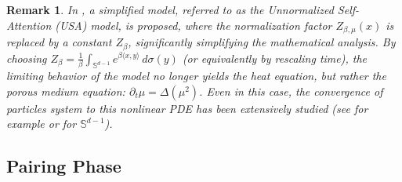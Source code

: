 \documentclass{article}
\numberwithin{theorem}{section}
\newtheorem{remark}[theorem]{Remark}
\begin{document}
\begin{remark}
  In \cite{geshkovski2023mathematical}, a simplified model, referred to as the Unnormalized Self-Attention (USA) model, is proposed, where the normalization factor $Z_{\beta,\mu}(x)$ is replaced by a constant $Z_{\beta}$, significantly simplifying the mathematical analysis. By choosing $
Z_{\beta} = \frac{1}{\beta} \int_{\mathbb{S}^{d-1}} e^{\beta \langle x, y \rangle} \, d\sigma(y)$ (or equivalently by rescaling time),
the limiting behavior of the model no longer yields the heat equation, but rather the porous medium equation:
$\partial_t \mu = \Delta(\mu^2)$.
Even in this case, the convergence of particles system to this nonlinear PDE has been extensively studied (see for example \cite{figalli2008convergence, lions2001methode, oelschlager1985law, oelschlager2001sequence} or \cite{shalova2025noisy} for $\mathbb{S}^{d-1}$).
\end{remark}


\subsection{Pairing Phase}\label{sec:pairing}
\end{document}
